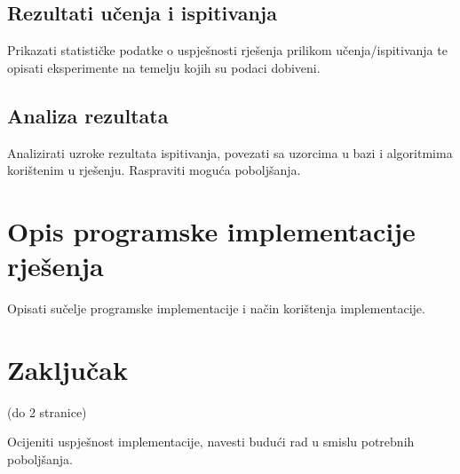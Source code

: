 \documentclass[times, utf8, zavrsni, numeric]{fer}
\begin{document}
\section{Rezultati učenja i ispitivanja}
Prikazati statističke podatke o uspješnosti rješenja prilikom učenja/ispitivanja te opisati eksperimente na temelju kojih su podaci dobiveni.

\section{Analiza rezultata}

Analizirati uzroke rezultata ispitivanja, povezati sa uzorcima u bazi i algoritmima korištenim u rješenju. Raspraviti moguća poboljšanja.

\chapter{Opis programske implementacije rješenja}

Opisati sučelje programske implementacije i način korištenja implementacije.


\chapter{Zaključak}

(do 2 stranice)

Ocijeniti uspješnost implementacije, navesti budući rad u smislu potrebnih poboljšanja. 



\end{document}
